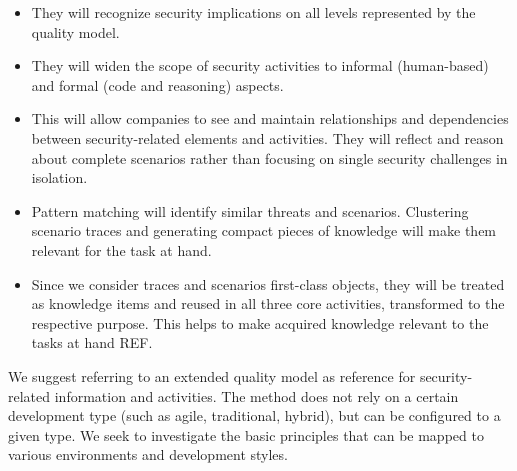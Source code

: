 \begin{itemize}
\vspace{-0.5em} \item They will recognize security implications on all levels represented by the quality model.
\vspace{-0.5em} \item They will widen the scope of security activities to informal (human-based) and formal (code and reasoning) aspects.
\vspace{-0.5em} \item This will allow companies to see and maintain relationships and dependencies between security-related elements and activities. They will reflect and reason about complete scenarios rather than focusing on single security challenges in isolation.
\vspace{-0.5em} \item Pattern matching will identify similar threats and scenarios. Clustering scenario traces and generating compact pieces of knowledge will make them relevant for the task at hand.
\vspace{-0.5em} \item Since we consider traces and scenarios first-class objects, they will be treated as knowledge items and reused in all three core activities, transformed to the respective purpose. This helps to make acquired knowledge relevant to the tasks at hand REF.
\end{itemize}

We suggest referring to an extended quality model as reference for security-related information and activities. The method does not rely on a certain development type (such as agile, traditional, hybrid), but can be configured to a given type. We seek to investigate the basic principles that can be mapped to various environments and development styles.